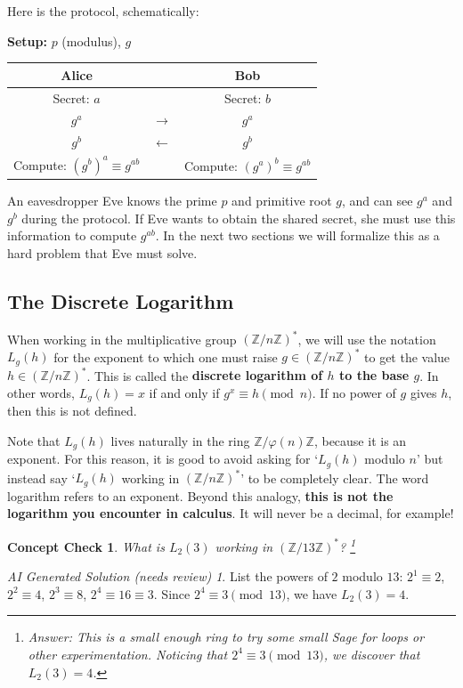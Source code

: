 \documentclass{article}
\theoremstyle{plain}
\newtheorem{checkin}[theorem]{Concept Check}
\theoremstyle{definition}
\theoremstyle{remark}
\newtheorem*{aisolution}{AI Generated Solution (needs review)}
\numberwithin{theorem}{section}
\newcommand{\ZZ}{\mathbb{Z}}
\begin{document}
Here is the protocol, schematically:
\begin{center}
     {\bf Setup:}  $p$ (modulus), $g$
     \vspace{1em}

     \begin{tabular}{ccc}
       Alice & & Bob \\
       \hline
       Secret: $a$ & &  Secret: $b$ \\
       $g^a$ & $\longrightarrow$ & $g^a$ \\
       $g^b$ & $\longleftarrow$ & $g^b$ \\
       Compute: $(g^b)^a \equiv g^{ab}$ & & Compute: $(g^a)^b \equiv g^{ab}$
      \end{tabular}
      \vspace{3em}
    \end{center}



      An eavesdropper Eve knows the prime $p$ and primitive root $g$, and can see $g^a$ and $g^b$ during the protocol.  If Eve wants to obtain the shared secret, she must use this information to compute $g^{ab}$.  In the next two sections we will formalize this as a hard problem that Eve must solve.

 
\subsection{The Discrete Logarithm}

When working in the multiplicative group $(\ZZ/n\ZZ)^*$, we will use the notation $L_g(h)$ for the exponent to which one must raise $g \in (\ZZ/n\ZZ)^*$ to get the value $h \in (\ZZ/n\ZZ)^*$.  This is called the \textbf{discrete logarithm of $h$ to the base $g$}.  In other words, $L_g(h) = x$ if and only if $g^x \equiv h \pmod n$.  If no power of $g$ gives $h$, then this is not defined.

Note that $L_g(h)$ lives naturally in the ring $\ZZ/\varphi(n)\ZZ$, because it is an exponent.  For this reason, it is good to avoid asking for `$L_g(h)$ modulo $n$' but instead say `$L_g(h)$ working in $(\ZZ/n\ZZ)^*$' to be completely clear.  The word logarithm refers to an exponent.  Beyond this analogy, \textbf{this is not the logarithm you encounter in calculus}.  It will never be a decimal, for example!

\begin{checkin}
    What is $L_2(3)$ working in $(\ZZ/13\ZZ)^*$?  \footnote{Answer: This is a small enough ring to try some small Sage for loops or other experimentation.  Noticing that $2^4 \equiv 3 \pmod{13}$, we discover that $L_2(3) = 4$.}
\end{checkin}
\begin{aisolution}
List the powers of $2$ modulo $13$: $2^1 \equiv 2$, $2^2 \equiv 4$, $2^3 \equiv 8$, $2^4 \equiv 16 \equiv 3$.  Since $2^4 \equiv 3 \pmod{13}$, we have $L_2(3) = 4$.
\end{aisolution}
\end{document}
